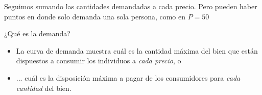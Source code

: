 \documentclass{beamer}
\begin{document}
\begin{frame}
\begin{figure}[H]
\begin{center}
    \end{center}
    \end{figure}
    Seguimos sumando las cantidades demandadas a cada precio. Pero pueden haber puntos en donde solo demanda una sola persona, como en $P = 50$
    
\end{frame}

  
\begin{frame}{¿Qué es la demanda?}
    \begin{itemize}
        \item La curva de demanda muestra cuál es la cantidad máxima del bien que están dispuestos a consumir los individuos a \textit{cada precio}, o \vspace{2mm}
        \item ...  cuál es la disposición máxima a pagar de los consumidores para \textit{cada cantidad} del bien.
    \end{itemize}
    \begin{center}
        \begin{figure}[H]
        \renewcommand{\figurename}{Figure}
        \begin{center}
        \end{center}
        \end{figure}
    \end{center}
\end{frame}
\end{document}
